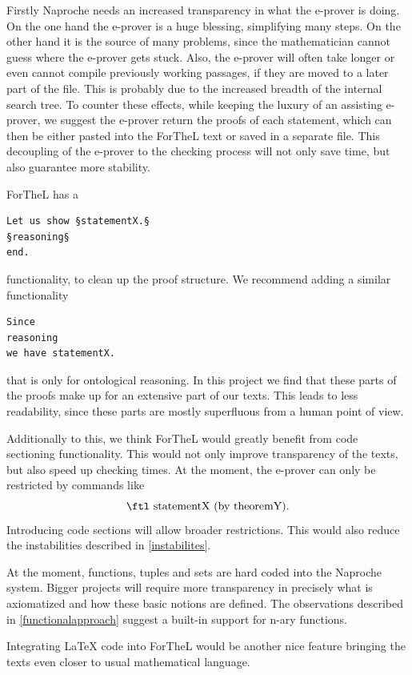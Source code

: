 \documentclass[11pt]{article}
\begin{document}
Firstly Naproche needs an increased transparency in what the e-prover is doing. On the one hand the e-prover is a huge blessing, simplifying many steps.
On the other hand it is the source of many problems, since the mathematician cannot guess where the e-prover gets stuck. Also, the e-prover will often take longer or even cannot compile previously working passages, if they are moved to a later part of the file.
This is probably due to the increased breadth of the internal search tree.
To counter these effects, while keeping the luxury of an assisting e-prover, we suggest the e-prover return the proofs of each statement, which can then be either pasted into the ForTheL text or saved in a separate file.
This decoupling of the e-prover to the checking process will not only save time, but also guarantee more stability.

ForTheL has a 
\begin{lstlisting}
Let us show §statementX.§
§reasoning§
end.
\end{lstlisting} 
functionality, to clean up the proof structure. We recommend adding a similar functionality
\begin{lstlisting}
Since 
reasoning
we have statementX.
\end{lstlisting} 
that is only for ontological reasoning. In this project we find that these parts of the proofs make up for an extensive part of our texts. This leads to less readability, since these parts are mostly superfluous from a human point of view.

Additionally to this, we think ForTheL would greatly benefit from code sectioning functionality. This would not only improve transparency of the texts, but also speed up checking times. At the moment, the e-prover can only be restricted by commands like
$$\text{\ftl statementX (by theoremY).}$$
Introducing code sections will allow broader restrictions. This would also reduce the instabilities described in \ref{instabilites}.

At the moment, functions, tuples and sets are hard coded into the Naproche system. Bigger projects will require more transparency in precisely what is axiomatized and how these basic notions are defined. The observations described in \ref{functionalapproach} suggest a built-in support for n-ary functions.

Integrating LaTeX code into ForTheL would be another nice feature bringing the texts even closer to usual mathematical language.
\end{document}

